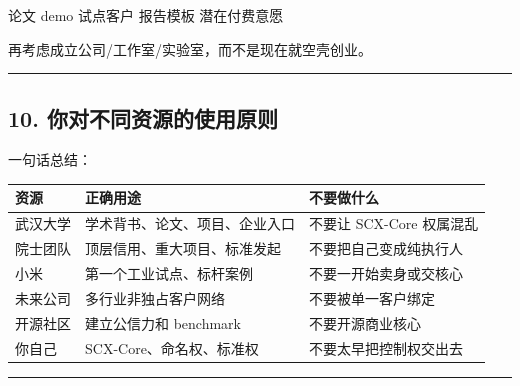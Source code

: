 \documentclass[
  12pt,
]{ctexart}
\newenvironment{Shaded}{}{}
\newcommand{\NormalTok}[1]{#1}
\begin{document}
\begin{Shaded}
\begin{Highlighting}[]
\NormalTok{论文}
\NormalTok{demo}
\NormalTok{试点客户}
\NormalTok{报告模板}
\NormalTok{潜在付费意愿}
\end{Highlighting}
\end{Shaded}

再考虑成立公司/工作室/实验室，而不是现在就空壳创业。

\begin{center}\rule{0.5\linewidth}{0.5pt}\end{center}

\subsection{10.
你对不同资源的使用原则}\label{ux4f60ux5bf9ux4e0dux540cux8d44ux6e90ux7684ux4f7fux7528ux539fux5219}

一句话总结：

\begin{longtable}[]{@{}
  >{\raggedright\arraybackslash}p{}
  >{\raggedright\arraybackslash}p{}
  >{\raggedright\arraybackslash}p{}@{}}
\toprule\noalign{}
\begin{minipage}[b]{\linewidth}\raggedright
资源
\end{minipage} & \begin{minipage}[b]{\linewidth}\raggedright
正确用途
\end{minipage} & \begin{minipage}[b]{\linewidth}\raggedright
不要做什么
\end{minipage} \\
\midrule\noalign{}
\endhead
\bottomrule\noalign{}
\endlastfoot
武汉大学 & 学术背书、论文、项目、企业入口 & 不要让 SCX-Core 权属混乱 \\
院士团队 & 顶层信用、重大项目、标准发起 & 不要把自己变成纯执行人 \\
小米 & 第一个工业试点、标杆案例 & 不要一开始卖身或交核心 \\
未来公司 & 多行业非独占客户网络 & 不要被单一客户绑定 \\
开源社区 & 建立公信力和 benchmark & 不要开源商业核心 \\
你自己 & SCX-Core、命名权、标准权 & 不要太早把控制权交出去 \\
\end{longtable}

\begin{center}\rule{0.5\linewidth}{0.5pt}\end{center}
\end{document}
